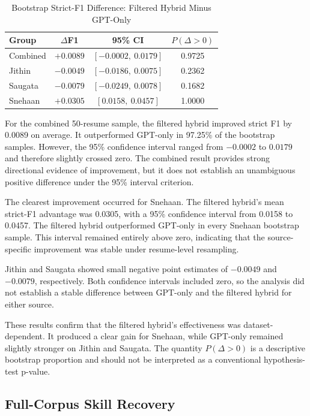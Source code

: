 \documentclass[conference]{IEEEtran}
\begin{document}
\begin{table}[t]
\caption{Bootstrap Strict-F1 Difference: Filtered Hybrid Minus GPT-Only}
\label{tab:bootstrap_results}
\centering
\scriptsize
\setlength{\tabcolsep}{3.0pt}
\begin{tabular}{lccc}
\toprule
Group & $\Delta$F1 & 95\% CI & $P(\Delta > 0)$ \\
\midrule
Combined & $+0.0089$ & $[-0.0002,\ 0.0179]$ & 0.9725 \\
Jithin & $-0.0049$ & $[-0.0186,\ 0.0075]$ & 0.2362 \\
Saugata & $-0.0079$ & $[-0.0249,\ 0.0078]$ & 0.1682 \\
Snehaan & $+0.0305$ & $[0.0158,\ 0.0457]$ & 1.0000 \\
\bottomrule
\end{tabular}
\end{table}

For the combined 50-resume sample, the filtered hybrid improved strict
F1 by 0.0089 on average. It outperformed GPT-only in 97.25\% of the
bootstrap samples. However, the 95\% confidence interval ranged from
$-0.0002$ to $0.0179$ and therefore slightly crossed zero. The combined
result provides strong directional evidence of improvement, but it does
not establish an unambiguous positive difference under the 95\%
interval criterion.

The clearest improvement occurred for Snehaan. The filtered hybrid's
mean strict-F1 advantage was 0.0305, with a 95\% confidence interval
from 0.0158 to 0.0457. The filtered hybrid outperformed GPT-only in
every Snehaan bootstrap sample. This interval remained entirely above
zero, indicating that the source-specific improvement was stable under
resume-level resampling.

Jithin and Saugata showed small negative point estimates of
$-0.0049$ and $-0.0079$, respectively. Both confidence intervals
included zero, so the analysis did not establish a stable difference
between GPT-only and the filtered hybrid for either source.

These results confirm that the filtered hybrid's effectiveness was
dataset-dependent. It produced a clear gain for Snehaan, while GPT-only
remained slightly stronger on Jithin and Saugata. The quantity
$P(\Delta > 0)$ is a descriptive bootstrap proportion and should not
be interpreted as a conventional hypothesis-test p-value.

\subsection{Full-Corpus Skill Recovery}
\end{document}
